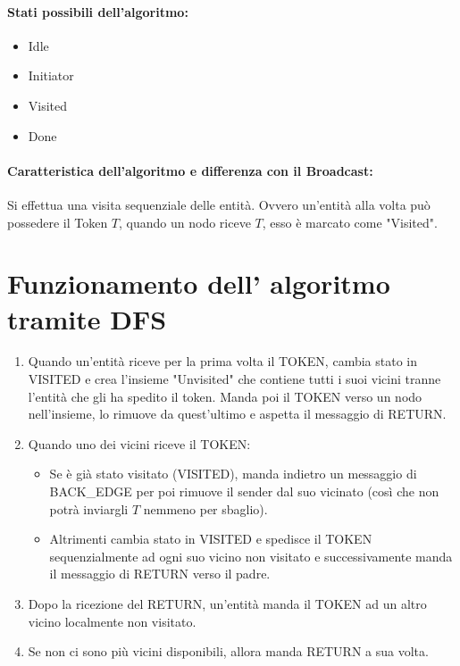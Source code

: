 \paragraph{Stati possibili dell'algoritmo:}
\begin{itemize}
    \item Idle
    \item Initiator
    \item Visited
    \item Done
\end{itemize}

\paragraph{Caratteristica dell'algoritmo e differenza con il Broadcast:} Si
effettua una visita sequenziale delle entità. Ovvero un'entità alla volta può
possedere il Token $T$, quando un nodo riceve $T$, esso è marcato come "Visited".

\section{Funzionamento dell' algoritmo tramite DFS}
\begin{enumerate}
    \item Quando un'entità riceve per la prima volta il TOKEN, cambia stato in
          VISITED e crea l'insieme "Unvisited" che contiene tutti i suoi vicini
          tranne l'entità che gli ha spedito il token. Manda poi il TOKEN verso
          un nodo nell'insieme, lo rimuove da quest'ultimo e aspetta il
          messaggio di RETURN.
    \item Quando uno dei vicini riceve il TOKEN:
          \begin{itemize}
              \item Se è già stato visitato (VISITED), manda indietro un
                    messaggio di BACK\_EDGE per poi rimuove il sender dal suo
                    vicinato (così che non potrà inviargli $T$ nemmeno per
                    sbaglio).
              \item Altrimenti cambia stato in VISITED e spedisce il TOKEN
                    sequenzialmente ad ogni suo vicino non visitato e
                    successivamente manda il messaggio di RETURN verso il padre.
          \end{itemize}
    \item Dopo la ricezione del RETURN, un'entità manda il TOKEN ad un altro
          vicino localmente non visitato.
    \item Se non ci sono più vicini disponibili, allora manda RETURN a sua volta.
\end{enumerate}


